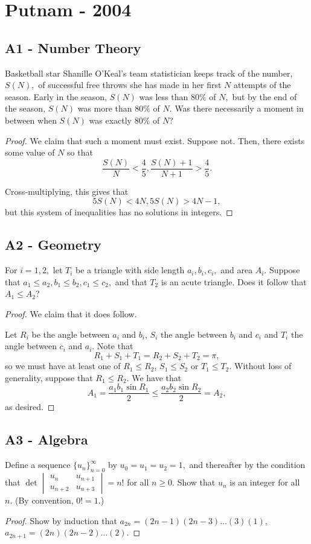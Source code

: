 \documentclass[11pt]{scrartcl}
\newcommand{\<}{\langle}
\renewcommand{\>}{\rangle}
\begin{document}
\section{Putnam - 2004} 
\subsection{A1 - Number Theory}
Basketball star Shanille O'Keal's team statistician keeps track of the number, $S(N),$ of successful free throws she has made in her first $N$ attempts of the season. Early in the season, $S(N)$ was less than $80\%$ of $N,$ but by the end of the season, $S(N)$ was more than $80\%$ of $N.$ Was there necessarily a moment in between when $S(N)$ was exactly $80\%$ of $N$?
\begin{proof}
We claim that such a moment must exist.  Suppose not.  Then, there exists some value of $N$ so that 
$$\frac{S(N)}{N} < \frac{4}{5}, \frac{S(N) + 1}{N + 1} > \frac{4}{5}.$$

Cross-multiplying, this gives that $$5S(N) < 4N, 5S(N) > 4N -1,$$
but this system of inequalities has no solutions in integers.  
\end{proof}
\subsection{A2 - Geometry}
For $i=1,2,$ let $T_i$ be a triangle with side length $a_i,b_i,c_i,$ and area $A_i.$ Suppose that $a_1\le a_2, b_1\le b_2, c_1\le c_2,$ and that $T_2$ is an acute triangle. Does it follow that $A_1\le A_2$?
\begin{proof}
We claim that it does follow.

Let $R_i$ be the angle between $a_i$ and $b_i$, $S_i$ the angle between $b_i$ and $c_i$ and $T_i$ the angle between $c_i$ and $a_i$.  Note that 
$$R_1 + S_1 + T_1 = R_2 + S_2 + T_2 = \pi,$$
so we must have at least one of $R_1 \le R_2$, $S_1 \le S_2$ or $T_1 \le T_2$.  Without loss of generality, suppose that $R_1 \le R_2$.  We have that 
$$A_1 = \frac{a_1b_1 \sin R_1}{2} \le \frac{a_2 b_2 \sin R_2}{2} = A_2,$$
as desired.
\end{proof}
\subsection{A3 - Algebra}
Define a sequence $\{u_n\}_{n=0}^{\infty}$ by $u_0=u_1=u_2=1,$ and thereafter by the condition that
$\det\begin{vmatrix} u_n & u_{n+1} \\ u_{n+2} & u_{n+3} \end{vmatrix}=n!$
for all $n\ge 0.$ Show that $u_n$ is an integer for all $n.$ (By convention, $0!=1$.)
\begin{proof}
Show by induction that $a_{2n} = (2n-1)(2n-3) \dots (3)(1)$, $a_{2n+1} = (2n)(2n-2)\dots(2)$.
\end{proof}
\end{document}
